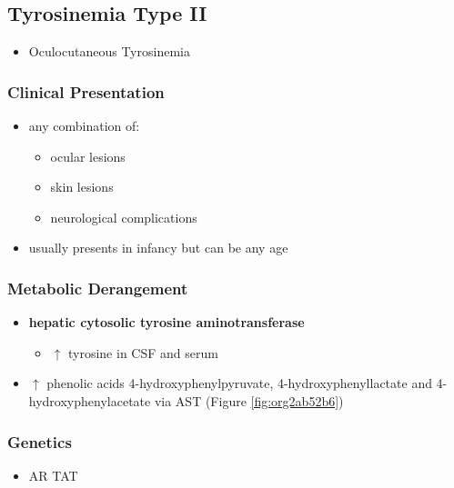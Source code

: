 \documentclass[12pt]{scrartcl}
\begin{document}
\subsection{Tyrosinemia Type II}
\label{sec:orga4a0624}
\begin{itemize}
\item Oculocutaneous Tyrosinemia
\end{itemize}
\subsubsection{Clinical Presentation}
\label{sec:orgf5feb9a}
\begin{itemize}
\item any combination of: 
\begin{itemize}
\item ocular lesions
\item skin lesions
\item neurological complications
\end{itemize}
\item usually presents in infancy but can be any age
\end{itemize}

\subsubsection{Metabolic Derangement}
\label{sec:orgccecb8c}
\begin{itemize}
\item \textbf{hepatic cytosolic tyrosine aminotransferase}


\begin{itemize}
\item \(\uparrow\) tyrosine in CSF and serum
\end{itemize}
\item \(\uparrow\) phenolic acids 4-hydroxyphenylpyruvate,
4-hydroxyphenyllactate and 4-hydroxyphenylacetate via AST (Figure \ref{fig:org2ab52b6})
\end{itemize}

\subsubsection{Genetics}
\label{sec:orgedc67f4}
\begin{itemize}
\item AR TAT
\end{itemize}
\end{document}
